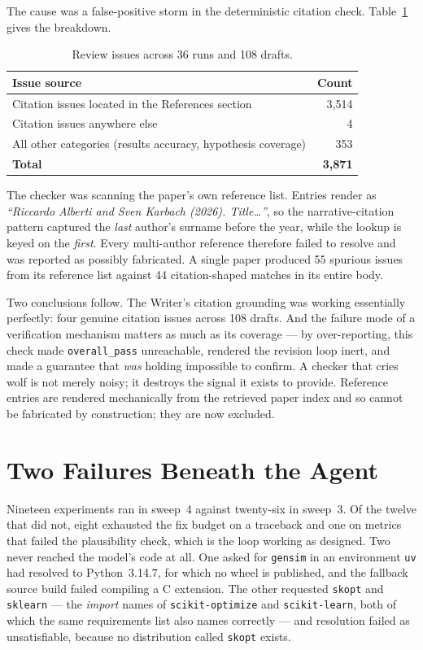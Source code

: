 The cause was a false-positive storm in the deterministic citation check.
Table~\ref{tab:citation-issues} gives the breakdown.

\begin{table}[htbp]
\centering\small
\caption{Review issues across 36 runs and 108 drafts.}
\label{tab:citation-issues}
\begin{tabularx}{\textwidth}{Xr}
\toprule
\textbf{Issue source} & \textbf{Count} \\
\midrule
Citation issues located in the References section & 3{,}514 \\
Citation issues anywhere else & 4 \\
All other categories (results accuracy, hypothesis coverage) & 353 \\
\midrule
\textbf{Total} & \textbf{3{,}871} \\
\bottomrule
\end{tabularx}
\end{table}

The checker was scanning the paper's own reference list. Entries render as
\emph{``Riccardo Alberti and Sven Karbach (2026). Title\ldots''}, so the
narrative-citation pattern captured the \emph{last} author's surname before the
year, while the lookup is keyed on the \emph{first}. Every multi-author reference
therefore failed to resolve and was reported as possibly fabricated. A single
paper produced 55 spurious issues from its reference list against 44
citation-shaped matches in its entire body.

Two conclusions follow. The Writer's citation grounding was working essentially
perfectly: four genuine citation issues across 108 drafts. And the failure mode of
a verification mechanism matters as much as its coverage --- by over-reporting,
this check made \texttt{overall\_pass} unreachable, rendered the revision loop
inert, and made a guarantee that \emph{was} holding impossible to confirm. A
checker that cries wolf is not merely noisy; it destroys the signal it exists to
provide. Reference entries are rendered mechanically from the retrieved paper
index and so cannot be fabricated by construction; they are now excluded.


\chapter{Two Failures Beneath the Agent}
\label{app:env-failures}

Nineteen experiments ran in sweep~4 against twenty-six in sweep~3. Of the twelve
that did not, eight exhausted the fix budget on a traceback and one on metrics that
failed the plausibility check, which is the loop working as designed. Two never
reached the model's code at all. One asked for \texttt{gensim} in an environment
\texttt{uv} had resolved to Python~3.14.7, for which no wheel is published, and the
fallback source build failed compiling a C extension. The other requested
\texttt{skopt} and \texttt{sklearn} --- the \emph{import} names of
\texttt{scikit-optimize} and \texttt{scikit-learn}, both of which the same
requirements list also names correctly --- and resolution failed as unsatisfiable,
because no distribution called \texttt{skopt} exists.


